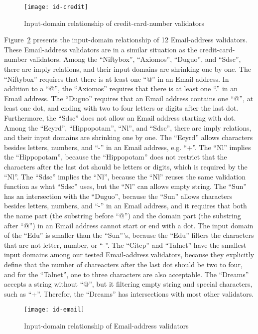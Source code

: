 \begin{figure}
\centering
\texttt{[image: id-credit]}
\caption{Input-domain relationship of credit-card-number validators}  
\label{fig:id-credit}
\end{figure}

Figure~\ref{fig:id-email} presents the input-domain relationship of 12 Email-address validators. These Email-address validators are in a similar situation as the credit-card-number validators. Among the ``Niftybox'', ``Axiomos'',  ``Duguo'', and ``Sdsc'', there are imply relations, and their input domains are shrinking one by one.  The ``Niftybox'' requires that there is at least one ``@'' in an Email address. In addition to a ``@'', the ``Axiomos'' requires that there is at least one ``.'' in an Email address. The ``Duguo'' requires that an Email address contains one ``@'', at least one dot, and ending with two to four letters or digits after the last dot. Furthermore, the ``Sdsc'' does not allow an Email address starting with dot. Among the ``Ecyrd'',  ``Hippopotam'', ``Nl'', and ``Sdsc'', there are imply relations, and their input domains are shrinking one by one. The ``Ecyrd'' allows characters besides letters, numbers, and ``-'' in an Email address, e.g. ``+''. The ``Nl'' implies the ``Hippopotam'', because the ``Hippopotam'' does not restrict that the characters after the last dot should be letters or digits, which is required by the ``Nl''. The ``Sdsc'' implies the ``Nl'', because the ``Nl'' reuses the same validation function as what ``Sdsc'' uses, but the ``Nl'' can allows empty string. The ``Sun'' has an intersection with the ``Duguo'', because the ``Sun'' allows characters besides letters, numbers, and ``-'' in an Email address,  and it requires that both the name part (the substring before ``@'') and the domain part (the substring after ``@'') in an Email address cannot start or end with a dot. The input domain of the ``Edu'' is smaller than the ``Sun'''s, because the ``Edu'' filters the characters that are not letter, number, or ``-''. The ``Citep'' and ``Talnet'' have the smallest input domains among our tested Email-address validators, because they explicitly define that the number of chareacters after the last dot should be two to four, and for the ``Talnet'', one to three characters are also acceptable. The ``Dreams'' accepts a string without ``@'', but it filtering empty string and special characters, such as ``+''. Therefor, the ``Dreams'' has intersections with most other validators. 

\begin{figure}
\centering
\texttt{[image: id-email]}
\caption{Input-domain relationship of Email-address validators}  
\label{fig:id-email}
\end{figure}